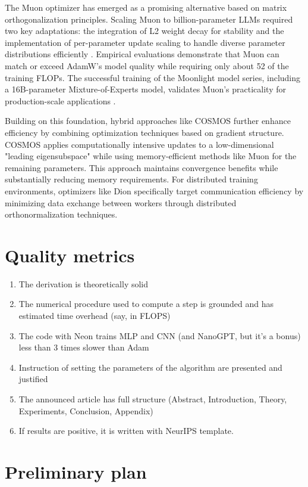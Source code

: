\documentclass[]{scrartcl}
\begin{document}
The Muon optimizer  has emerged as a promising alternative based on matrix orthogonalization principles. Scaling Muon to billion-parameter LLMs required two key adaptations: the integration of L2 weight decay for stability and the implementation of per-parameter update scaling to handle diverse parameter distributions efficiently . Empirical evaluations demonstrate that Muon can match or exceed AdamW's model quality while requiring only about 52 of the training FLOPs. The successful training of the Moonlight model series, including a 16B-parameter Mixture-of-Experts model, validates Muon's practicality for production-scale applications \cite{liu2025muon}.

Building on this foundation, hybrid approaches like COSMOS \cite{chen2025cosmoshybridadaptive} further enhance efficiency by combining optimization techniques based on gradient structure. COSMOS applies computationally intensive updates to a low-dimensional "leading eigensubspace" while using memory-efficient methods like Muon for the remaining parameters. This approach maintains convergence benefits while substantially reducing memory requirements. For distributed training environments, optimizers like Dion \cite{ahn2025dioncommunicationefficientoptimizerlarge} specifically target communication efficiency by minimizing data exchange between workers through distributed orthonormalization techniques.
\section{Quality metrics}
\begin{enumerate}
    \item The derivation is theoretically solid
    \item The numerical procedure used to compute a step is grounded and has estimated time overhead (say, in FLOPS)
    \item The code with Neon trains MLP and CNN (and NanoGPT, but it's a bonus) less than 3 times slower than Adam
    \item Instruction of setting the parameters of the algorithm are presented and justified
    \item The announced article has full structure (Abstract, Introduction, Theory, Experiments, Conclusion, Appendix)
    \item If results are positive, it is written with NeurIPS template.
\end{enumerate}

\section{Preliminary plan}
\end{document}
